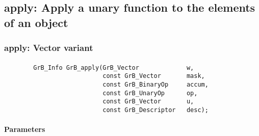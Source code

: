 \subsection{{\sf apply}: Apply a unary function to the elements of an object}


\subsubsection{{\sf apply}: Vector variant}
\paragraph{\syntax}

\begin{verbatim}
        GrB_Info GrB_apply(GrB_Vector             w,
                           const GrB_Vector       mask,
                           const GrB_BinaryOp     accum,
                           const GrB_UnaryOp      op,
                           const GrB_Vector       u,
                           const GrB_Descriptor   desc);
\end{verbatim}

\paragraph{Parameters}

